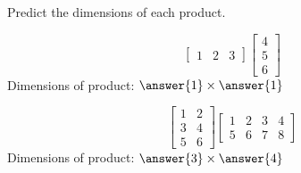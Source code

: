 \documentclass{ximera}
\begin{document}
\begin{problem}
Predict the dimensions of each product.
\begin{problem}
$$\begin{bmatrix}1&2&3\end{bmatrix}\begin{bmatrix}4\\5\\6\end{bmatrix}$$
Dimensions of product: $\answer{1}\times \answer{1}$
\end{problem}
\begin{problem}
$$\begin{bmatrix}1&2\\3&4\\5&6\end{bmatrix}\begin{bmatrix}1&2&3&4\\5&6&7&8\end{bmatrix}$$
Dimensions of product: $\answer{3}\times \answer{4}$
\end{problem}
\end{problem}
\end{document}
